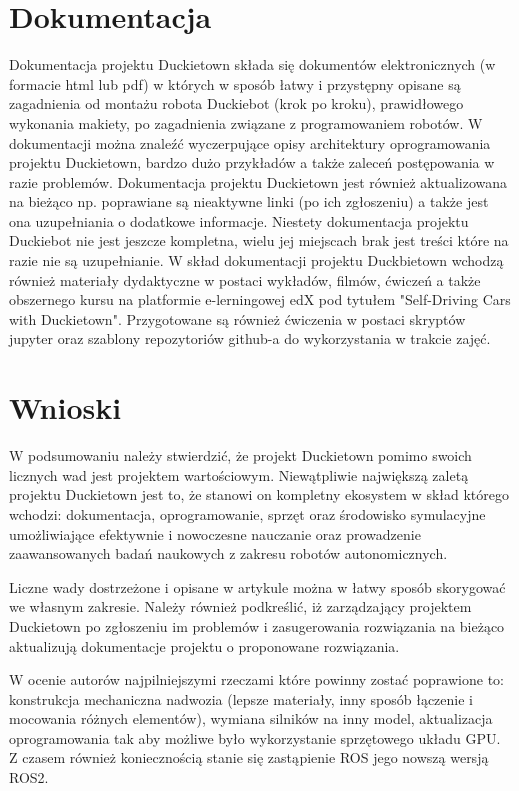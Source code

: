 \documentclass{svproc}
\begin{document}
\section{Dokumentacja}\label{sec:documentation}
Dokumentacja projektu Duckietown składa się dokumentów elektronicznych (w formacie html lub pdf)  w których w sposób łatwy i przystępny opisane są zagadnienia od montażu robota Duckiebot (krok po kroku), prawidłowego wykonania makiety, po zagadnienia związane z programowaniem robotów.
W dokumentacji można znaleźć wyczerpujące opisy architektury oprogramowania projektu Duckietown, bardzo dużo przykładów a także zaleceń postępowania w razie problemów. Dokumentacja projektu Duckietown jest również aktualizowana na bieżąco np. poprawiane są nieaktywne linki (po ich zgłoszeniu) a także jest ona uzupełniania o dodatkowe informacje.
Niestety dokumentacja projektu Duckiebot nie jest jeszcze kompletna, wielu jej miejscach brak jest treści które na razie nie są uzupełnianie.
W skład dokumentacji projektu Duckbietown wchodzą również materiały dydaktyczne w postaci wykładów, filmów, ćwiczeń a także obszernego kursu na platformie e-lerningowej edX pod tytułem "Self-Driving Cars with Duckietown". Przygotowane są również ćwiczenia w postaci skryptów jupyter oraz szablony repozytoriów github-a do wykorzystania w trakcie zajęć.

\section{Wnioski}\label{sec:conclusion}
W podsumowaniu należy stwierdzić, że projekt Duckietown pomimo swoich licznych wad jest projektem wartościowym. Niewątpliwie największą zaletą projektu Duckietown jest to, że stanowi on kompletny ekosystem w skład którego wchodzi: dokumentacja, oprogramowanie, sprzęt oraz środowisko symulacyjne umożliwiające efektywnie i nowoczesne nauczanie oraz prowadzenie zaawansowanych badań naukowych z zakresu robotów autonomicznych. 

Liczne wady dostrzeżone i opisane w artykule można w łatwy sposób skorygować we własnym zakresie. Należy również podkreślić, iż zarządzający projektem Duckietown po zgłoszeniu im problemów i zasugerowania rozwiązania na bieżąco aktualizują dokumentacje projektu o proponowane rozwiązania. 

W ocenie autorów najpilniejszymi rzeczami które powinny zostać poprawione to: konstrukcja mechaniczna nadwozia (lepsze materiały, inny sposób łączenie i mocowania różnych elementów), wymiana silników na inny model, aktualizacja oprogramowania tak aby możliwe było wykorzystanie sprzętowego układu GPU. Z czasem również koniecznością stanie się zastąpienie ROS jego nowszą wersją ROS2.




\end{document}
